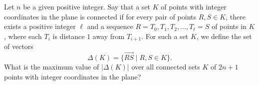Let $n$ be a given positive integer. Say that a set $K$ of points with integer coordinates in the plane is connected if for every pair of points $R, S\in K$, there exists a positive integer $\ell$ and a sequence $R=T_0,T_1, T_2,\ldots ,T_{\ell}=S$ of points in $K$, where each $T_i$ is distance $1$ away from $T_{i+1}$. For such a set $K$, we define the set of vectors \[\Delta(K)=\{\overrightarrow{RS}\mid R, S\in K\}.\] What is the maximum value of $|\Delta(K)|$ over all connected sets $K$ of $2n+1$ points with integer coordinates in the plane?